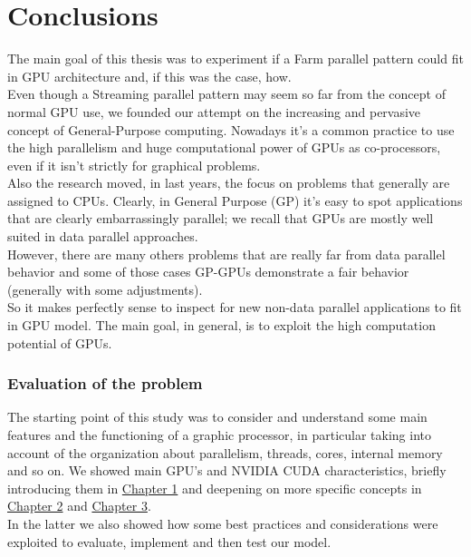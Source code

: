 \chapter{Conclusions} \label{chap:conclusions}
\setcounter{section}{1}
The main goal of this thesis was to experiment if a Farm parallel pattern could fit in GPU architecture and, if this was the case, how.\\
Even though a Streaming parallel pattern may seem so far from the concept of normal GPU use, we founded our attempt on the increasing and pervasive concept of General-Purpose computing.
Nowadays it's a common practice to use the high parallelism and huge computational power of GPUs as co-processors, even if it isn't strictly for graphical problems.\\
Also the research moved, in last years, the focus on problems that generally are assigned to CPUs. Clearly, in General Purpose (GP) it's easy to spot applications that are clearly embarrassingly parallel; we recall that GPUs are mostly well suited in data parallel approaches.\\
However, there are many others problems that are really far from data parallel behavior and some of those cases GP-GPUs demonstrate a fair behavior (generally with some adjustments).\\
So it makes perfectly sense to inspect for new non-data parallel applications to fit in GPU model. The main goal, in general, is to exploit the high computation potential of GPUs.


\subsection{Evaluation of the problem}
The starting point of this study was to consider and understand some main features and the functioning of a graphic processor, in particular taking into account of the organization about parallelism, threads, cores, internal memory and so on. We showed main GPU's and NVIDIA CUDA characteristics, briefly introducing them in \hyperref[chap:into]{Chapter 1} and deepening on more specific concepts in \hyperref[chap:tools]{Chapter 2} and \hyperref[chap:logic]{Chapter 3}.\\
In the latter we also showed how some best practices and considerations were exploited to evaluate, implement and then test our model. \\

